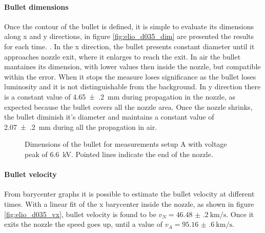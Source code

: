 \paragraph{Bullet dimensions}
Once the contour of the bullet is defined, it is simple to evaluate its dimensions along x and y directions, in figure \ref{fig:elio_d035_dim} are presented the results for each time.
.
In the x direction, the bullet presents constant diameter until it approaches nozzle exit, where it enlarges to reach the exit. In air the bullet mantaines its dimension, with lower values then inside the nozzle, but compatible within the error. When it stops the measure loses significance as the bullet loses luminosity and it is not distinguishable from the background.
In y direction there is a constant value of \SI{4.65(20)}{\milli\meter} during propagation in the nozzle, as expected because the bullet covers all the nozzle area. Once the nozzle shrinks, the bullet diminish it's diameter and maintains a constant value of \SI{2.07(20)}{\milli\meter} during all the propagation in air.
\begin{figure}
 \centering
 \hfill
 \caption{Dimensions of the bullet for measurements setup A with voltage peak of \SI{6.6}{\kilo\volt}. Pointed lines indicate the end of the nozzle.}
 \label{fig:elio_d035_I}
\end{figure}


\paragraph{Bullet velocity}
From barycenter graphs it is possible to estimate the bullet velocity at different times.
With a linear fit of the x barycenter inside the nozzle, as shown in figure \ref{fig:elio_d035_vx}, bullet velocity is found to be $v_{N} = \SI{46.48(20)}{\kilo\meter/\second}$. Once it exits the nozzle the speed goes up, until a value of $v_{A} = \SI{95.16(60)}{\kilo\meter/\second}$.

